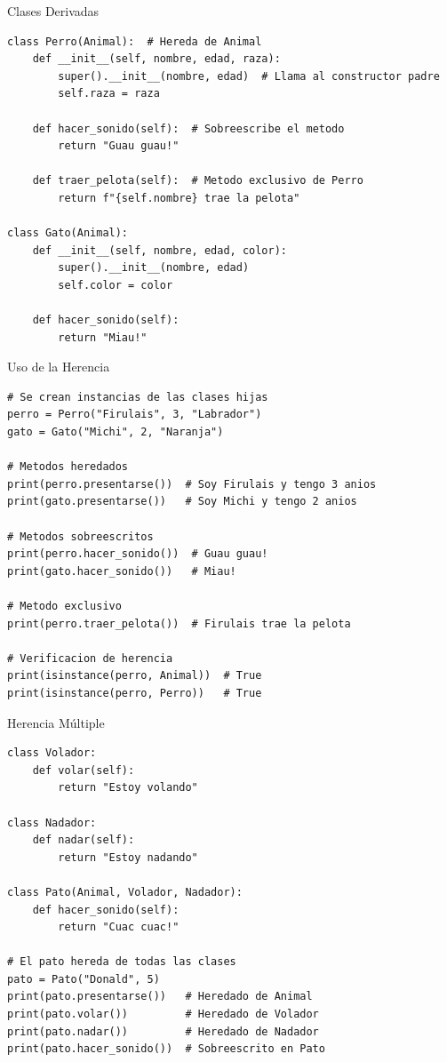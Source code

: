 \documentclass[aspectratio=169]{beamer}
\begin{document}
\begin{frame}[fragile]{Clases Derivadas}
    \begin{lstlisting}[title=Clases Hijas que Heredan de Animal]
class Perro(Animal):  # Hereda de Animal
    def __init__(self, nombre, edad, raza):
        super().__init__(nombre, edad)  # Llama al constructor padre
        self.raza = raza
    
    def hacer_sonido(self):  # Sobreescribe el metodo
        return "Guau guau!"
    
    def traer_pelota(self):  # Metodo exclusivo de Perro
        return f"{self.nombre} trae la pelota"

class Gato(Animal):
    def __init__(self, nombre, edad, color):
        super().__init__(nombre, edad)
        self.color = color
    
    def hacer_sonido(self):
        return "Miau!"
    \end{lstlisting}
\end{frame}

\begin{frame}[fragile]{Uso de la Herencia}
    \begin{lstlisting}[title=Instanciación y Uso]
# Se crean instancias de las clases hijas
perro = Perro("Firulais", 3, "Labrador")
gato = Gato("Michi", 2, "Naranja")

# Metodos heredados
print(perro.presentarse())  # Soy Firulais y tengo 3 anios
print(gato.presentarse())   # Soy Michi y tengo 2 anios

# Metodos sobreescritos
print(perro.hacer_sonido())  # Guau guau!
print(gato.hacer_sonido())   # Miau!

# Metodo exclusivo
print(perro.traer_pelota())  # Firulais trae la pelota

# Verificacion de herencia
print(isinstance(perro, Animal))  # True
print(isinstance(perro, Perro))   # True
    \end{lstlisting}
\end{frame}

\begin{frame}[fragile]{Herencia Múltiple}
    \begin{lstlisting}[title=Una Clase Puede Heredar de Múltiples Padres]
class Volador:
    def volar(self):
        return "Estoy volando"

class Nadador:
    def nadar(self):
        return "Estoy nadando"

class Pato(Animal, Volador, Nadador):
    def hacer_sonido(self):
        return "Cuac cuac!"

# El pato hereda de todas las clases
pato = Pato("Donald", 5)
print(pato.presentarse())   # Heredado de Animal
print(pato.volar())         # Heredado de Volador
print(pato.nadar())         # Heredado de Nadador
print(pato.hacer_sonido())  # Sobreescrito en Pato
    \end{lstlisting}
\end{frame}
\end{document}
